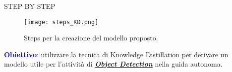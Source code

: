 \begin{frame}{STEP BY STEP}
    \begin{figure}
        \centering
        \texttt{[image: steps\_KD.png]}
        \centering
        \caption{Steps per la creazione del modello proposto.}
    \end{figure}
    \alert{\textcolor{blue}{\textbf{{Obiettivo}}}}: utilizzare la tecnica di Knowledge Distillation per derivare un 
    modello utile per l'attività di {\bfseries{\emph{\ul{Object Detection}}}} nella guida autonoma.
\end{frame}


